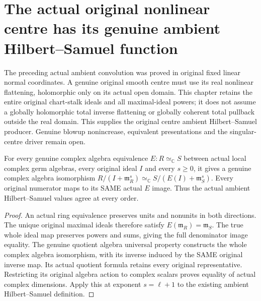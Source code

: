 \chapter{The actual original nonlinear centre has its genuine ambient Hilbert--Samuel function}

The preceding actual ambient convolution was proved in original fixed linear
normal coordinates. A genuine original smooth centre must use its real
nonlinear flattening, holomorphic only on its actual open domain. This chapter
retains the entire original chart-stalk ideals and all maximal-ideal powers;
it does not assume a globally holomorphic total inverse flattening or globally
coherent total pullback outside the real domain. This supplies the original
centre ambient Hilbert--Samuel producer. Genuine blowup nonincrease,
equivalent presentations and the singular-centre driver remain open.

\begin{theorem}
\label{hir:smooth-centre-actual-whole-ambient-jet-transport}
\leanok
For every genuine complex algebra equivalence $E:R\simeq_{\mathbb C}S$
between actual local complex germ algebras, every original ideal $I$ and
every $s\geq0$, it gives a genuine complex algebra isomorphism
$R/(I+\mathfrak m_R^s)\simeq_{\mathbb C}
S/(E(I)+\mathfrak m_S^s)$. Every original numerator maps to its SAME
actual $E$ image. Thus the actual ambient Hilbert--Samuel values agree at
every order.
\end{theorem}
\begin{proof}
An actual ring equivalence preserves units and nonunits in both directions.
The unique original maximal ideals therefore satisfy
$E(\mathfrak m_R)=\mathfrak m_S$. The true whole ideal map preserves powers
and sums, giving the full denominator image equality. The genuine quotient
algebra universal property constructs the whole complex algebra isomorphism,
with its inverse induced by the SAME original inverse map. Its actual
quotient formula retains every original representative. Restricting its
original algebra action to complex scalars proves equality of actual complex
dimensions. Apply this at exponent $s=\ell+1$ to the existing ambient
Hilbert--Samuel definition.
\end{proof}


